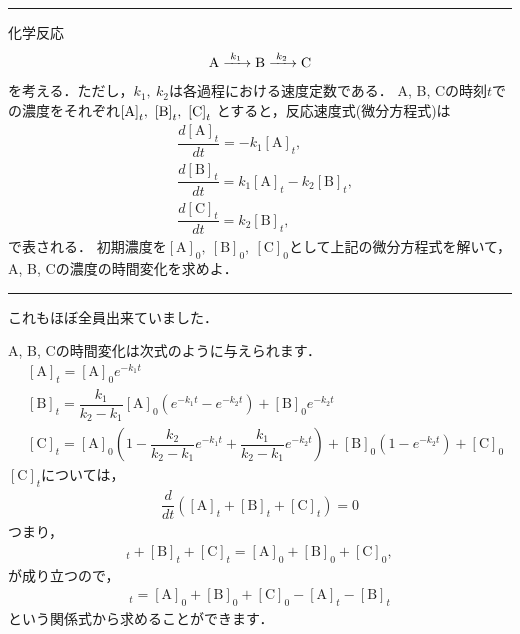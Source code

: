 \documentclass[11pt,a4]{jsarticle}
\numberwithin{equation}{section}
\begin{document}
\newpage
\hrule
\vspace*{.2cm}
\enshu
化学反応
\begin{align*}
 \ce{A ->[k_1] B ->[k_2] C}  
\end{align*}
を考える．ただし，$k_1,~k_2$は各過程における速度定数である．
A, B, Cの時刻$t$での濃度をそれぞれ$\ce{[A]}_t,~\ce{[B]}_t,~\ce{[C]}_t$
とすると，反応速度式(微分方程式)は
\begin{align*}
  &\dfrac{d[\mathrm{A}]_t}{dt} = -k_1 [\mathrm{A}]_t, \\
  &\dfrac{d[\mathrm{B}]_t}{dt} =  k_1 [\mathrm{A}]_t - k_2 [\mathrm{B}]_t, \\
  &\dfrac{d[\mathrm{C}]_t}{dt} =  k_2 [\mathrm{B}]_t, 
\end{align*}
で表される．
初期濃度を$[\mathrm{A}]_0,~[\mathrm{B}]_0,~[\mathrm{C}]_0$として上記の微分方程式を解いて，
A, B, Cの濃度の時間変化を求めよ．
\vspace*{.2cm}
\hrule
\vspace*{.2cm}

これもほぼ全員出来ていました．

A, B, Cの時間変化は次式のように与えられます．
\begin{align*}
 &[\mathrm{A}]_t = [\mathrm{A}]_{0}e^{-k_1 t} \\ 
 &[\mathrm{B}]_t = \dfrac{k_1}{k_2 - k_1}[\mathrm{A}]_0 \left(e^{-k_1 t}-e^{-k_2 t}\right) + [\mathrm{B}]_0 e^{-k_2 t} \\
 & \left[\mathrm{C}\right]_{t}  =\left[\mathrm{A}\right]_{0}\left(1-\dfrac{k_{2}}{k_{2}-k_{1}}e^{-k_{1}t}+\dfrac{k_{1}}{k_{2}-k_{1}}e^{-k_{2}t}\right)+\left[\mathrm{B}\right]_{0}\left(1-e^{-k_{2}t}\right)+\left[\mathrm{C}\right]_{0}
\end{align*}
$[\mathrm{C}]_t$については，
\begin{align*}
 \dfrac{d}{dt}\left([\mathrm{A}]_t + [\mathrm{B}]_t + [\mathrm{C}]_t\right) = 0 
\end{align*}
つまり，
\begin{align*}
 [\mathrm{A}]_t + [\mathrm{B}]_t + [\mathrm{C}]_t =[\mathrm{A}]_0 + [\mathrm{B}]_0 + [\mathrm{C}]_0,
\end{align*}
が成り立つので，
\begin{align*}
 [\mathrm{C}]_t = [\mathrm{A}]_0 + [\mathrm{B}]_0 + [\mathrm{C}]_0 - [\mathrm{A}]_t - [\mathrm{B}]_t
\end{align*}
という関係式から求めることができます．
\end{document}
